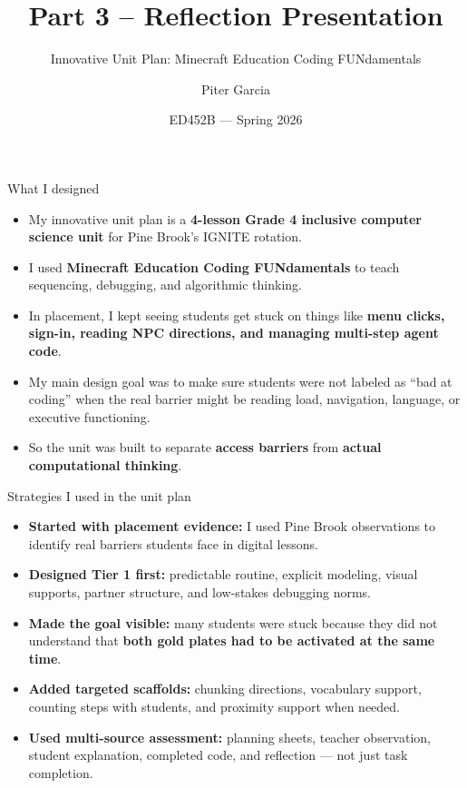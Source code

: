 \documentclass[aspectratio=169,11pt]{beamer}
\title{Part 3 -- Reflection Presentation}
\subtitle{Innovative Unit Plan: Minecraft Education Coding FUNdamentals}
\author{Piter Garcia}
\date{ED452B --- Spring 2026}
\begin{document}
\begin{frame}
  \titlepage
\end{frame}

\begin{frame}{What I designed}
\justifying
\begin{itemize}
  \item My innovative unit plan is a \textbf{4-lesson Grade 4 inclusive computer science unit} for Pine Brook's IGNITE rotation.
  \item I used \textbf{Minecraft Education Coding FUNdamentals} to teach sequencing, debugging, and algorithmic thinking.
  \item In placement, I kept seeing students get stuck on things like \textbf{menu clicks, sign-in, reading NPC directions, and managing multi-step agent code}.
  \item My main design goal was to make sure students were not labeled as \alert{``bad at coding''} when the real barrier might be reading load, navigation, language, or executive functioning.
  \item So the unit was built to separate \textbf{access barriers} from \textbf{actual computational thinking}. 
\end{itemize}
\end{frame}

\begin{frame}{Strategies I used in the unit plan}
\begin{itemize}
  \item \textbf{Started with placement evidence:} I used Pine Brook observations to identify real barriers students face in digital lessons.
  \item \textbf{Designed Tier 1 first:} predictable routine, explicit modeling, visual supports, partner structure, and low-stakes debugging norms.
  \item \textbf{Made the goal visible:} many students were stuck because they did not understand that \textbf{both gold plates had to be activated at the same time}.
  \item \textbf{Added targeted scaffolds:} chunking directions, vocabulary support, counting steps with students, and proximity support when needed.
  \item \textbf{Used multi-source assessment:} planning sheets, teacher observation, student explanation, completed code, and reflection --- not just task completion.
\end{itemize}
\end{frame}
\end{document}
